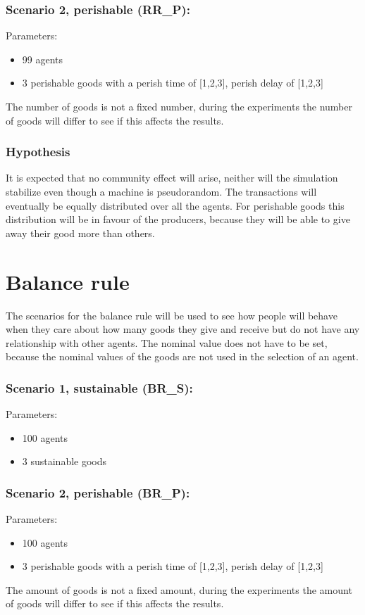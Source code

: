 \documentclass[twoside,openright]{uva-bachelor-thesis}
\begin{document}
\subsubsection{Scenario 2, perishable (RR\_P):}
Parameters:
\begin{itemize}
\item	99 agents
\item	3 perishable goods with a perish time of [1,2,3], perish delay of [1,2,3]
\end{itemize}
The number of goods is not a fixed number, during the experiments the number of goods will differ to see if this affects the results.

\subsubsection{Hypothesis}
It is expected that no community effect will arise, neither will the simulation stabilize even though a machine is pseudorandom. The transactions will eventually be equally distributed over all the agents. For perishable goods this distribution will be in favour of the producers, because they will be able to give away their good more than others.

\section{Balance rule}
The scenarios for the balance rule will be used to see how people will behave when they care about how many goods they give and receive but do not have any relationship with other agents. The nominal value does not have to be set, because the nominal values of the goods are not used in the selection of an agent.
\subsubsection{Scenario 1, sustainable (BR\_S):}
Parameters:
\begin{itemize}
\item	100 agents
\item	3 sustainable goods
\end{itemize}
\subsubsection{Scenario 2, perishable (BR\_P):}
Parameters:
\begin{itemize}
\item	100 agents
\item	3 perishable goods with a perish time of [1,2,3], perish delay of [1,2,3]
\end{itemize}
The amount of goods is not a fixed amount, during the experiments the amount of goods will differ to see if this affects the results.
\end{document}
